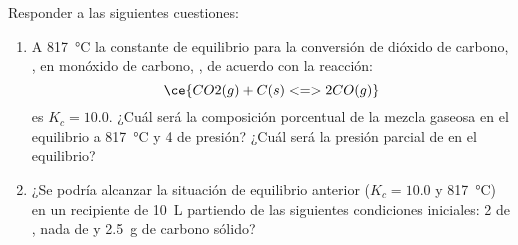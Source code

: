 Responder a las siguientes cuestiones:
\begin{enumerate}[label={\alph*)},font=\bfseries]
	\item A \SI{817}{\celsius} la constante de equilibrio para la conversión de dióxido de carbono, , en monóxido de carbono, , de acuerdo con la reacción:
		$$
			\ce{CO2(g) + C(s) <=> 2CO(g)}
		$$
		es  $K_c = \num{10,0}$. ¿Cuál será la composición porcentual de la mezcla gaseosa en el equilibrio a \SI{817}{\celsius} y \SI{4}{\atm} de presión? ¿Cuál será la presión parcial de  en el equilibrio?
	\item ¿Se podría alcanzar la situación de equilibrio anterior ($K_c = \num{10,0}$ y \SI{817}{\celsius}) en un recipiente de \SI{10}{\liter} partiendo de las siguientes condiciones iniciales: \SI{2}{\atm} de , nada de  y \SI{2,5}{\gram} de carbono sólido?
\end{enumerate}
